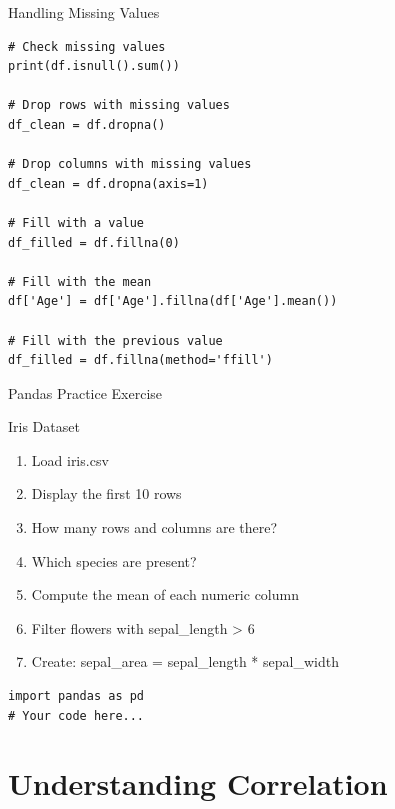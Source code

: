 \documentclass[aspectratio=169]{beamer}
\begin{document}
\begin{frame}[fragile]{Handling Missing Values}
\begin{lstlisting}
# Check missing values
print(df.isnull().sum())

# Drop rows with missing values
df_clean = df.dropna()

# Drop columns with missing values
df_clean = df.dropna(axis=1)

# Fill with a value
df_filled = df.fillna(0)

# Fill with the mean
df['Age'] = df['Age'].fillna(df['Age'].mean())

# Fill with the previous value
df_filled = df.fillna(method='ffill')
\end{lstlisting}
\end{frame}

\begin{frame}[fragile]{Pandas Practice Exercise}
\begin{block}{Iris Dataset}
\begin{enumerate}
    \item Load iris.csv
    \item Display the first 10 rows
    \item How many rows and columns are there?
    \item Which species are present?
    \item Compute the mean of each numeric column
    \item Filter flowers with sepal\_length > 6
    \item Create: sepal\_area = sepal\_length * sepal\_width
\end{enumerate}
\end{block}

\begin{lstlisting}
import pandas as pd
# Your code here...
\end{lstlisting}
\end{frame}

\section{Understanding Correlation}
\end{document}
